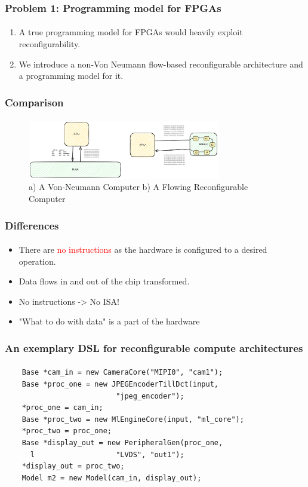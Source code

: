 \documentclass{beamer}
\begin{document}
{\begin{frame}[fragile]
\end{frame}


\begin{frame}[fragile]
\frametitle{Problem 1: Programming model for FPGAs}
\framesubtitle{}
  \begin{enumerate}
    \item A true programming model for FPGAs would heavily exploit
      reconfigurability.
    \item We introduce a non-Von Neumann flow-based reconfigurable architecture and a programming model
      for it.
  \end{enumerate}
\end{frame}

\begin{frame}[fragile]
  \frametitle{Comparison}
  \framesubtitle{}
  \begin{figure}
    \centering
    \includegraphics[width=0.75\textwidth]{images/flow.png}
    \caption{a) A Von-Neumann Computer b) A Flowing Reconfigurable Computer}
    \label{}
  \end{figure}
\end{frame}

\begin{frame}[fragile]
  \frametitle{Differences}
  \framesubtitle{}

  \begin{itemize}
    \item There are \textcolor{red}{no instructions} as the hardware
  is configured to a desired operation. 
      
    \item Data flows in and out of the chip transformed. 

    \item No instructions -> No ISA!

    \item "What to do with data" is a part of the hardware
  \end{itemize}
\end{frame}

\begin{frame}[fragile]
  \frametitle{An exemplary DSL for reconfigurable compute architectures}
\framesubtitle{}
  \begin{verbatim}
    Base *cam_in = new CameraCore("MIPI0", "cam1");
    Base *proc_one = new JPEGEncoderTillDct(input, 
                          "jpeg_encoder");
    *proc_one = cam_in;
    Base *proc_two = new MlEngineCore(input, "ml_core");
    *proc_two = proc_one;
    Base *display_out = new PeripheralGen(proc_one, 
      l                   "LVDS", "out1");
    *display_out = proc_two;
    Model m2 = new Model(cam_in, display_out);
  \end{verbatim}
\end{frame}

}
\end{document}
